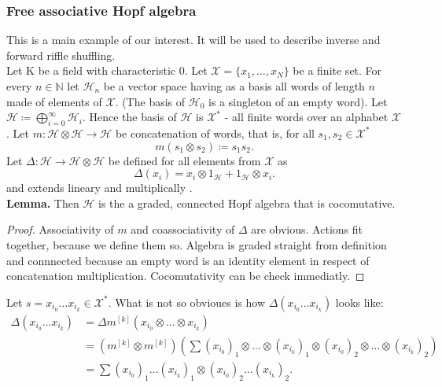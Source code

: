 \documentclass[a4paper, 12pt]{report}
\begin{document}
\subsubsection{Free associative Hopf algebra}
This is a main example of our interest. It will be used to describe inverse and forward riffle shuffling.\\
Let K be a field with characteristic 0. 
Let $\mathcal{X} = \{x_1, \dots, x_N\}$ be a finite set. For every $n \in \mathbb{N}$ let 
$\mathcal{H}_n$ be a vector space having as a basis all words of length $n$ made of elements 
of $\mathcal{X}$. (The basis of $\mathcal{H}_0$ is a singleton of an empty word). 
Let $\mathcal{H} \coloneqq \displaystyle\bigoplus^{\infty}_{i = 0} \mathcal{H}_i$. Hence 
the basis of $\mathcal{H}$ is $\mathcal{X}^*$ - all finite words over an alphabet $\mathcal{X}$.
Let $m : \mathcal{H} \otimes \mathcal{H} \to \mathcal{H}$ be concatenation of words, 
that is, for all $s_1, s_2 \in \mathcal{X}^*$
\begin{equation*}
m(s_1 \otimes s_2) \coloneqq s_1s_2.
\end{equation*}
Let $\Delta : \mathcal{H} \to \mathcal{H} \otimes \mathcal{H}$ be defined for all elements from 
$\mathcal{X}$ as
\begin{equation*}
\Delta(x_i) = x_i \otimes 1_\mathcal{H} + 1_\mathcal{H} \otimes x_i.
\end{equation*}
and extends lineary and multiplically .\\
\textbf{Lemma. } Then $\mathcal{H}$ is the a graded, connected Hopf algebra that is cocomutative.
\begin{proof}
Associativity of $m$ and coassociativity of $\Delta$ are obvious. Actions fit together, 
because we define them so. Algebra is graded straight from definition and connnected because an empty word 
is an identity element in respect of concatenation multiplication. Cocomutativity can be check immediatly.
\end{proof}
\noindent Let $s = x_{i_0}\dots x_{i_k} \in \mathcal{X}^*$. What is not so obvioues is 
how $\Delta(x_{i_0}\dots x_{i_k})$ looks like:
\begin{align}
\Delta(x_{i_0}\dots x_{i_k}) &= \Delta m^{[k]}(x_{i_0} \otimes \dots \otimes x_{i_k}) \\ 
&= (m^{[k]} \otimes m^{[k]}) \left(\sum (x_{i_0})_1 \otimes \dots \otimes (x_{i_k})_1 \otimes 
(x_{i_0})_2 \otimes \dots \otimes (x_{i_k})_2\right) \\ 
&= \sum (x_{i_0})_1 \dots (x_{i_k})_1 \otimes 
(x_{i_0})_2 \dots (x_{i_k})_2.
\end{align}
\end{document}
